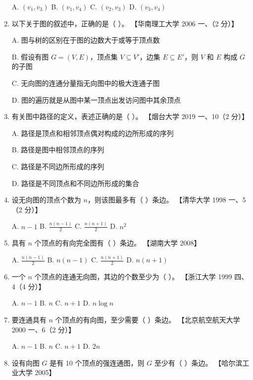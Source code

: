 \documentclass[lang=cn,newtx,10pt,scheme=chinese]{../../elegantbook}
\begin{document}
\begin{enumerate}
        A. $(v_1, v_3)$ \quad B. $(v_1, v_4)$ \quad C. $(v_2, v_3)$ \quad D. $(v_3, v_4)$  
    
        \item 以下关于图的叙述中，正确的是（ ）。  
        【华南理工大学 2006 一、（2 分）】  

        A. 图与树的区别在于图的边数大于或等于顶点数  

        B. 假设有图 $G = (V, E)$，顶点集 $V \subseteq V'$，边集 $E \subseteq E'$，则 $V$ 和 $E$ 构成 $G$ 的子图  

        C. 无向图的连通分量指无向图中的极大连通子图  

        D. 图的遍历就是从图中某一顶点出发访问图中其余顶点  
    
        \item 有关图中路径的定义，表述正确的是（ ）。  
        【烟台大学 2019 一、10（2 分）】  

        A. 路径是顶点和相邻顶点偶对构成的边所形成的序列  

        B. 路径是图中相邻顶点的序列  

        C. 路径是不同边所形成的序列  

        D. 路径是不同顶点和不同边所形成的集合  
    
        \item 设无向图的顶点个数为 $n$，则该图最多有（ ）条边。  
        【清华大学 1998 一、5（2 分）】  

        A. $n - 1$ \quad B. $\frac{n(n-1)}{2}$ \quad C. $\frac{n(n+1)}{2}$ \quad D. $n^2$ 


        \item 具有 $n$ 个顶点的有向完全图有（ ）条边。  
        【湖南大学 2008】  

        A. $\frac{n(n-1)}{2}$ \quad B. $n(n-1)$ \quad C. $\frac{n(n+1)}{2}$ \quad D. $n(n+1)$  
    
        \item 一个 $n$ 个顶点的连通无向图，其边的个数至少为（ ）。  
        【浙江大学 1999 四、4（4 分）】  

        A. $n-1$ \quad B. $n$ \quad C. $n+1$ \quad D. $n \log n$  
    
        \item 要连通具有 $n$ 个顶点的有向图，至少需要（ ）条边。  
        【北京航空航天大学 2000 一、6（2 分）】  

        A. $n-1$ \quad B. $n$ \quad C. $n+1$ \quad D. $2n$  
    
        \item 设有向图 $G$ 是有 10 个顶点的强连通图，则 $G$ 至少有（ ）条边。  
        【哈尔滨工业大学 2005】  


\end{enumerate}
\end{document}
